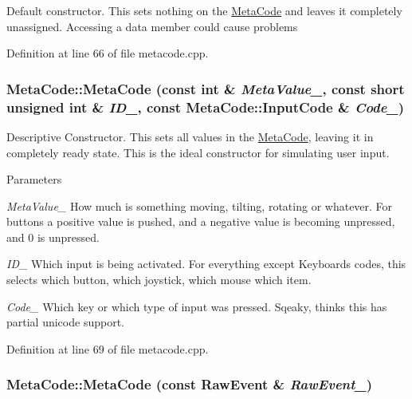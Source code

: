 Default constructor. This sets nothing on the \hyperlink{classMetaCode}{MetaCode} and leaves it completely unassigned. Accessing a data member could cause problems 

Definition at line 66 of file metacode.cpp.\hypertarget{classMetaCode_aaa5c96e46212847295db722a8253e86a}{
\subsubsection[{MetaCode}]{\setlength{\rightskip}{0pt plus 5cm}MetaCode::MetaCode (const int \& {\em MetaValue\_\-}, \/  const short unsigned int \& {\em ID\_\-}, \/  const {\bf MetaCode::InputCode} \& {\em Code\_\-})}}
\label{d7/d72/classMetaCode_aaa5c96e46212847295db722a8253e86a}


Descriptive Constructor. This sets all values in the \hyperlink{classMetaCode}{MetaCode}, leaving it in completely ready state. This is the ideal constructor for simulating user input. 
\begin{DoxyParams}{Parameters}
\item[{\em MetaValue\_\-}]How much is something moving, tilting, rotating or whatever. For buttons a positive value is pushed, and a negative value is becoming unpressed, and 0 is unpressed. \item[{\em ID\_\-}]Which input is being activated. For everything except Keyboards codes, this selects which button, which joystick, which mouse which item. \item[{\em Code\_\-}]Which key or which type of input was pressed. Sqeaky, thinks this has partial unicode support. \end{DoxyParams}


Definition at line 69 of file metacode.cpp.\hypertarget{classMetaCode_a87b260ce7ee3a66c75320c0fc37cdc0a}{
\subsubsection[{MetaCode}]{\setlength{\rightskip}{0pt plus 5cm}MetaCode::MetaCode (const RawEvent \& {\em RawEvent\_\-})}}
\label{d7/d72/classMetaCode_a87b260ce7ee3a66c75320c0fc37cdc0a}



